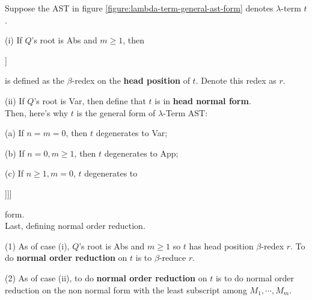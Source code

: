 \documentclass[]{article}
\def\b{\beta}
\def\l{\lambda}
\begin{document}
Suppose the AST in figure \ref{figure:lambda-term-general-ast-form} denotes $\l$-term $t$.

(i) If $Q$'s root is Abs and $m \geq 1$, then \begin{forest}
	[App
		[$Q$]
		[$M_1$]]
\end{forest} is defined as the $\b$-redex on the \textbf{head position} of $t$. Denote this redex as $r$.

(ii) If $Q$'s root is Var, then define that $t$ is in \textbf{head normal form}.\\


Then, here's why $t$ is the general form of $\l$-Term AST:

(a) If $n=m=0$, then $t$ degenerates to Var;

(b) If $n=0, m \geq 1$, then $t$ degenerates to App;

(c) If $n \geq 1, m = 0$, $t$ degenerates to \begin{forest}
	[Abs
		[,phantom]
		[\dots
			[,phantom]
			[Abs
				[,phantom]
				[Var]]]]
\end{forest} form.\\


Last, defining normal order reduction.

(1) As of case (i), $Q$'s root is Abs and $m \geq 1$ so $t$ has head position $\b$-redex $r$. To do \textbf{normal order reduction} on $t$ is to $\b$-reduce $r$.

(2) As of case (ii), to do \textbf{normal order reduction} on $t$ is to do normal order reduction on the non normal form with the least subscript among $M_1,\cdots,M_m$.


\end{document}

